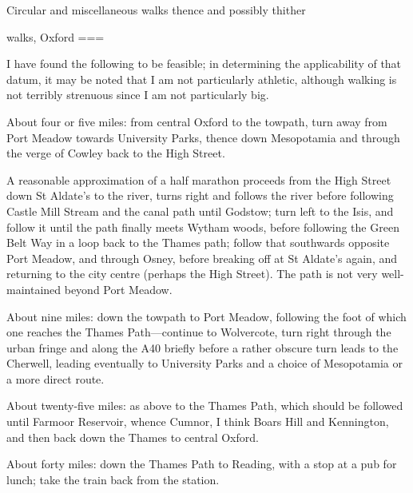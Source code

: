 Circular and miscellaneous walks thence and possibly thither

walks, Oxford
===

I have found the following to be feasible; in determining the applicability of that datum, it may be noted that I am not particularly athletic, although walking is not terribly strenuous since I am not particularly big.

About four or five miles: from central Oxford to the towpath, turn away from Port Meadow towards University Parks, thence down Mesopotamia and through the verge of Cowley back to the High Street.

A reasonable approximation of a half marathon proceeds from the High Street down St Aldate’s to the river, turns right and follows the river before following Castle Mill Stream and the canal path until Godstow; turn left to the Isis, and follow it until the path finally meets Wytham woods, before following the Green Belt Way in a loop back to the Thames path; follow that southwards opposite Port Meadow, and through Osney, before breaking off at St Aldate’s again, and returning to the city centre (perhaps the High Street). The path is not very well-maintained beyond Port Meadow.

About nine miles: down the towpath to Port Meadow, following the foot of which one reaches the Thames Path—continue to Wolvercote, turn right through the urban fringe and along the A40 briefly before a rather obscure turn leads to the Cherwell, leading eventually to University Parks and a choice of Mesopotamia or a more direct route.

About twenty-five miles: as above to the Thames Path, which should be followed until Farmoor Reservoir, whence Cumnor, I think Boars Hill and Kennington, and then back down the Thames to central Oxford.

About forty miles: down the Thames Path to Reading, with a stop at a pub for lunch; take the train back from the station.